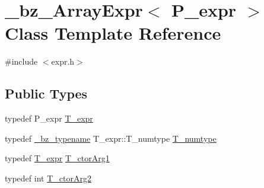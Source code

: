 \hypertarget{class__bz__ArrayExpr}{}\section{\+\_\+bz\+\_\+\+Array\+Expr$<$ P\+\_\+expr $>$ Class Template Reference}
\label{class__bz__ArrayExpr}


{\ttfamily \#include $<$expr.\+h$>$}

\subsection*{Public Types}
\begin{DoxyCompactItemize}
\item 
typedef P\+\_\+expr \hyperlink{class__bz__ArrayExpr_a1675ef17c504a89b9bc1e8ddf4e875c2}{T\+\_\+expr}
\item 
typedef \hyperlink{compiler_8h_a1bc40add3e72effc9cf69dbe445cbdfd}{\+\_\+bz\+\_\+typename} T\+\_\+expr\+::\+T\+\_\+numtype \hyperlink{class__bz__ArrayExpr_afa1ec55de102cafbc549da90093af10b}{T\+\_\+numtype}
\item 
typedef \hyperlink{class__bz__ArrayExpr_a1675ef17c504a89b9bc1e8ddf4e875c2}{T\+\_\+expr} \hyperlink{class__bz__ArrayExpr_a417e9cdc832f5a33d48bc504ce4ce6f5}{T\+\_\+ctor\+Arg1}
\item 
typedef int \hyperlink{class__bz__ArrayExpr_a8b947078f5ab5273f0b36bca3129c3e3}{T\+\_\+ctor\+Arg2}
\end{DoxyCompactItemize}
